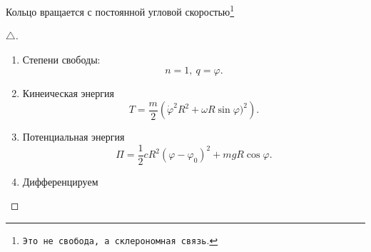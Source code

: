 Кольцо вращается с постоянной угловой скоростью\footnote{
    \texttt{Это не свобода, а склерономная связь}.
}
\begin{proof}[$\triangle$]
    \begin{minipage}[t]{0.9\textwidth}
        \begin{enumerate}[label = \Roman*.]
            \item Степени свободы:
            \begin{equation*}
                n=1, \ q = \varphi.
            \end{equation*}
            \item Кинеическая энергия
            \begin{equation*}
                T = \frac{m}{2} 
                \left(
                    \dot{\varphi}^2 R^2  + \omega R \sin \varphi)^2
                \right).
            \end{equation*}
            \item Потенциальная энергия
            \begin{equation*}
                \Pi = 
                \frac{1}{2} cR^2 (\varphi - \varphi_0)^2 + mg R \cos \varphi.
            \end{equation*}
            \item Дифференцируем
            
        \end{enumerate}
    \end{minipage}

\phantom{42}
\end{proof}

